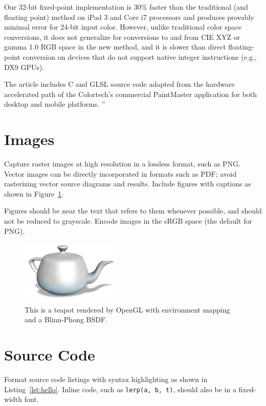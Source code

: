 \documentclass{jcgt}
\begin{document}
Our 32-bit fixed-point
implementation is 30\% faster than the traditional (and floating point) method on
iPad 3 and Core i7 processors and produces provably
minimal error for 24-bit input color.  However,  unlike traditional color space
conversions, it does not generalize for conversions to and from CIE XYZ or
gamma 1.0 RGB space in the new method, and it is slower than direct floating-point
conversion on devices that do not support native integer instructions (e.g., DX9 GPUs).

The article includes C and GLSL source code adapted from the hardware accelerated path of the Colortech's commercial PaintMaster application for
both desktop and mobile platforms. ''

\section{Images}

Capture raster images at high resolution in a lossless format, such as PNG.  Vector images
can be directly incorporated in formats such as PDF; avoid rasterizing vector source diagrams
and results.  Include figures with captions as shown in Figure~\ref{fig:teapot}.

Figures should be near the text that refers to them whenever possible, and should not be
reduced to grayscale.  Encode images in the sRGB space (the default for PNG).

\begin{figure}[htb]
  \centering
   \includegraphics[width=0.5\columnwidth]{teapot.png}
   \caption{\label{fig:teapot}
     This is a teapot rendered by OpenGL with environment mapping and a Blinn-Phong BSDF.}
\end{figure}

\section{Source Code}

Format source code listings with syntax highlighting as shown in Listing~\ref{lst:hello}.  Inline
code, such as \lstinline{lerp(a, b, t)}, should also be in a fixed-width font.
\end{document}
